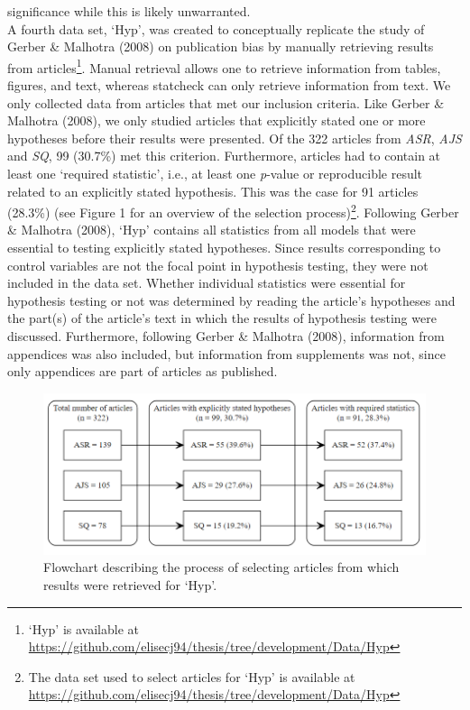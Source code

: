 \documentclass[
  12pt,
]{article}
\begin{document}
significance while this is likely unwarranted.\\
\hspace*{0.333em}\hspace*{0.333em}\hspace*{0.333em}\hspace*{0.333em}A
fourth data set, `Hyp', was created to conceptually replicate the study
of Gerber \& Malhotra (2008) on publication bias by manually retrieving
results from articles\footnote{`Hyp' is available at
  \url{https://github.com/elisecj94/thesis/tree/development/Data/Hyp}}.
Manual retrieval allows one to retrieve information from tables,
figures, and text, whereas statcheck can only retrieve information from
text. We only collected data from articles that met our inclusion
criteria. Like Gerber \& Malhotra (2008), we only studied articles that
explicitly stated one or more hypotheses before their results were
presented. Of the 322 articles from \emph{ASR}, \emph{AJS} and
\emph{SQ}, 99 (30.7\%) met this criterion. Furthermore, articles had to
contain at least one `required statistic', i.e., at least one
\emph{p}-value or reproducible result related to an explicitly stated
hypothesis. This was the case for 91 articles (28.3\%) (see Figure 1 for
an overview of the selection process)\footnote{The data set used to
  select articles for `Hyp' is available at
  \url{https://github.com/elisecj94/thesis/tree/development/Data/Hyp}}.
Following Gerber \& Malhotra (2008), `Hyp' contains all statistics from
all models that were essential to testing explicitly stated hypotheses.
Since results corresponding to control variables are not the focal point
in hypothesis testing, they were not included in the data set. Whether
individual statistics were essential for hypothesis testing or not was
determined by reading the article's hypotheses and the part(s) of the
article's text in which the results of hypothesis testing were
discussed. Furthermore, following Gerber \& Malhotra (2008), information
from appendices was also included, but information from supplements was
not, since only appendices are part of articles as published.\\

\begin{figure}
\centering
\includegraphics{Flowchart_thesis.png}
\caption{Flowchart describing the process of selecting articles from
which results were retrieved for `Hyp'.}
\end{figure}
\end{document}
